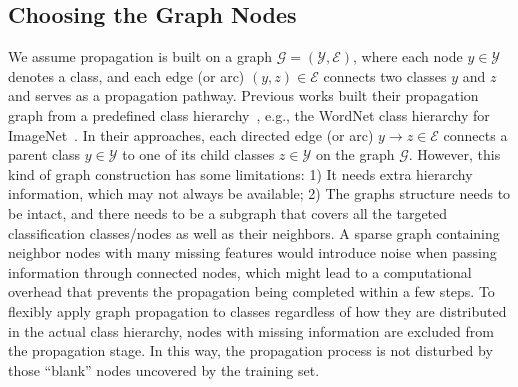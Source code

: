 \documentclass[letterpaper]{article} %
\def\gG{{\mathcal{G}}}
\begin{document}
\subsection{Choosing the Graph Nodes}

We assume propagation is built on a graph $\gG=(\mathcal Y, \mathcal E)$, where each node $y\in \mathcal Y$ denotes a class, and each edge (or arc) $(y,z)\in\mathcal E$ connects two classes $y$ and $z$ and serves as a propagation pathway. Previous works built their propagation graph from a predefined class hierarchy~\cite{wang2018zero,kampffmeyer2019rethinking}, e.g., the WordNet class hierarchy for ImageNet~\cite{imagenet}. In their approaches, each directed edge (or arc) $y\rightarrow z\in \mathcal E$ connects a parent class $y\in\mathcal Y$ to one of its child classes $z\in\mathcal Y$ on the graph $\gG$. However, this kind of graph construction has some limitations: 1) It needs extra hierarchy information, which may not always be available; 2) The graphs structure needs to be intact, and there needs to be a subgraph that covers all the targeted classification classes/nodes as well as their neighbors. A sparse graph containing neighbor nodes with many missing features would introduce noise when passing information through connected nodes, which might lead to a computational overhead that prevents the propagation being completed within a few steps.
To flexibly apply graph propagation to classes regardless of how they are distributed in the actual class hierarchy, nodes with missing information are excluded from the propagation stage. In this way, the propagation process is not disturbed by those ``blank'' nodes uncovered by the training set.
\end{document}
